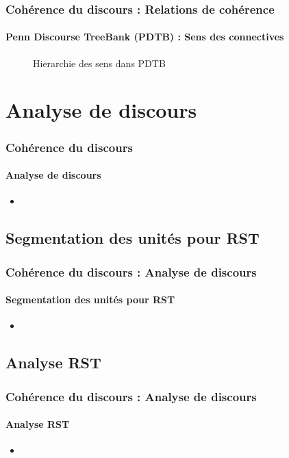 \documentclass[xcolor=table]{beamer}
\begin{document}
\begin{frame}
	\frametitle{Cohérence du discours : Relations de cohérence}
	\framesubtitle{Penn Discourse TreeBank (PDTB) : Sens des connectives}
	
	\begin{figure}
		\caption{Hierarchie des sens dans PDTB \cite{2008-prasad-al}}
	\end{figure}
	
\end{frame}

\section{Analyse de discours}

\begin{frame}
	\frametitle{Cohérence du discours}
	\framesubtitle{Analyse de discours}
	
	\begin{itemize}
		\item 
	\end{itemize}
	
\end{frame}

\subsection{Segmentation des unités pour RST}

\begin{frame}
	\frametitle{Cohérence du discours : Analyse de discours}
	\framesubtitle{Segmentation des unités pour RST}
	
	\begin{itemize}
		\item 
	\end{itemize}
	
\end{frame}

\subsection{Analyse RST}

\begin{frame}
	\frametitle{Cohérence du discours : Analyse de discours}
	\framesubtitle{Analyse RST}
	
	\begin{itemize}
		\item 
	\end{itemize}
	
\end{frame}
\end{document}
